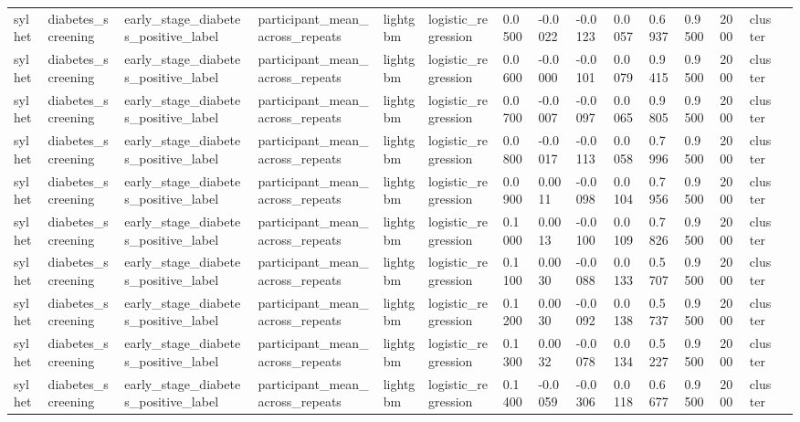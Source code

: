 \begin{tabular}{lllllllllllllll}
sylhet & diabetes\_screening & early\_stage\_diabetes\_positive\_label & participant\_mean\_across\_repeats & lightgbm & logistic\_regression & 0.0500 & -0.0022 & -0.0123 & 0.0057 & 0.6937 & 0.9500 & 2000 & cluster &  \\
sylhet & diabetes\_screening & early\_stage\_diabetes\_positive\_label & participant\_mean\_across\_repeats & lightgbm & logistic\_regression & 0.0600 & -0.0000 & -0.0101 & 0.0079 & 0.9415 & 0.9500 & 2000 & cluster &  \\
sylhet & diabetes\_screening & early\_stage\_diabetes\_positive\_label & participant\_mean\_across\_repeats & lightgbm & logistic\_regression & 0.0700 & -0.0007 & -0.0097 & 0.0065 & 0.9805 & 0.9500 & 2000 & cluster &  \\
sylhet & diabetes\_screening & early\_stage\_diabetes\_positive\_label & participant\_mean\_across\_repeats & lightgbm & logistic\_regression & 0.0800 & -0.0017 & -0.0113 & 0.0058 & 0.7996 & 0.9500 & 2000 & cluster &  \\
sylhet & diabetes\_screening & early\_stage\_diabetes\_positive\_label & participant\_mean\_across\_repeats & lightgbm & logistic\_regression & 0.0900 & 0.0011 & -0.0098 & 0.0104 & 0.7956 & 0.9500 & 2000 & cluster &  \\
sylhet & diabetes\_screening & early\_stage\_diabetes\_positive\_label & participant\_mean\_across\_repeats & lightgbm & logistic\_regression & 0.1000 & 0.0013 & -0.0100 & 0.0109 & 0.7826 & 0.9500 & 2000 & cluster &  \\
sylhet & diabetes\_screening & early\_stage\_diabetes\_positive\_label & participant\_mean\_across\_repeats & lightgbm & logistic\_regression & 0.1100 & 0.0030 & -0.0088 & 0.0133 & 0.5707 & 0.9500 & 2000 & cluster &  \\
sylhet & diabetes\_screening & early\_stage\_diabetes\_positive\_label & participant\_mean\_across\_repeats & lightgbm & logistic\_regression & 0.1200 & 0.0030 & -0.0092 & 0.0138 & 0.5737 & 0.9500 & 2000 & cluster &  \\
sylhet & diabetes\_screening & early\_stage\_diabetes\_positive\_label & participant\_mean\_across\_repeats & lightgbm & logistic\_regression & 0.1300 & 0.0032 & -0.0078 & 0.0134 & 0.5227 & 0.9500 & 2000 & cluster &  \\
sylhet & diabetes\_screening & early\_stage\_diabetes\_positive\_label & participant\_mean\_across\_repeats & lightgbm & logistic\_regression & 0.1400 & -0.0059 & -0.0306 & 0.0118 & 0.6677 & 0.9500 & 2000 & cluster &  \\

\end{tabular}
